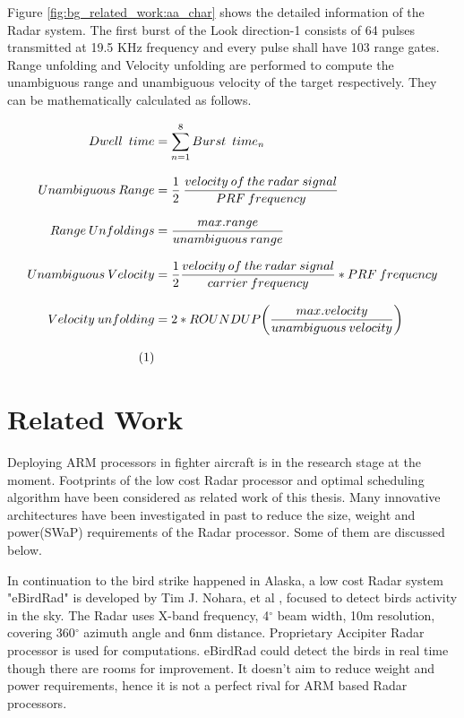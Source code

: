 Figure \ref{fig:bg_related_work:aa_char} shows the detailed information of the Radar system. The first burst of the Look direction-1 consists of 64 pulses transmitted at 19.5 KHz frequency and every pulse shall have 103 range gates. Range unfolding and Velocity unfolding are performed to compute the unambiguous range and unambiguous velocity of the target respectively. They can be mathematically calculated as follows. 

\begin{align*}
	\label{equ:burst_time_calc}
	Dwell \enspace time &= \sum\limits_{n=1}^{8} Burst \enspace time_{n} \\[0.3cm]
	Unambiguous \: Range &= \frac{1}{2} \: \frac{velocity \: of \: the \: radar \: signal}{PRF \: frequency} \\[0.3cm]
	Range \: Unfoldings &= \frac{max.range}{unambiguous \: range} \\[0.3cm]
	Unambiguous \: Velocity &= \frac{1}{2} \frac{velocity \: of \: the \: radar \: signal}{carrier \: frequency} * PRF \: frequency \\[0.3cm]
	Velocity \: unfolding &= 2 * ROUNDUP \bigg( \frac{max.velocity}{unambiguous \: velocity} \bigg ) \\[0.3cm] \stepcounter{equation}\tag{\theequation} 
\end{align*}

\section{Related Work}
\label{sec:related_work}
Deploying ARM processors in fighter aircraft is in the research stage at the moment. Footprints of the low cost Radar processor and optimal scheduling algorithm have been considered as related work of this thesis. Many innovative architectures have been investigated in past to reduce the size, weight and power(SWaP) requirements of the Radar processor. Some of them are discussed below.

In continuation to the bird strike happened in Alaska, a low cost Radar system "eBirdRad" is developed by Tim J. Nohara, et al \cite{relWork1}, focused to detect birds activity in the sky. The Radar uses X-band frequency, 4$^{\circ}$ beam width, 10m resolution, covering 360$^{\circ}$  azimuth angle and 6nm distance. Proprietary Accipiter Radar processor is used for computations. eBirdRad could detect the birds in real time though there are rooms for improvement. It doesn't aim to reduce weight and power requirements, hence it is not a perfect rival for ARM based Radar processors. 

